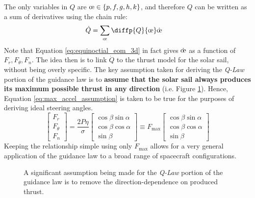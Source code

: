 The only variables in \(Q\) are \(\moe \in \{p, f, g, h, k\}\), and therefore \(Q\) can be written as a sum of derivatives using the chain rule:
\begin{align*}
  \dot{Q} & = \sum_{\moe} \diffp{Q}{{\moe}} \dot{\moe}
\end{align*}
Note that Equation \ref{eq:equinoctial_eom_3d} in fact gives \(\dot{\moe}\) as a function of \(F_r, F_\theta, F_n\). The idea then is to link \(\dot{Q}\) to the thrust model for the solar sail, without being overly specific. The key assumption taken for deriving the \textit{Q-Law} portion of the guidance law is to \textbf{assume that the solar sail always produces its maximum possible thrust in any direction} (i.e. Figure \ref{fig:thrust_curve}). Hence, Equation \ref{eq:max_accel_assumption} is taken to be true for the purposes of deriving ideal steering angles.
\begin{equation}
  \begin{bmatrix}
    F_r      \\
    F_\theta \\
    F_n
  \end{bmatrix} =
  \frac{2P\eta}{\sigma}
  \begin{bmatrix}
    \cos \beta \sin \alpha \\
    \cos \beta \cos \alpha \\
    \sin \beta
  \end{bmatrix}
  \equiv
  F_{\max}
  \begin{bmatrix}
    \cos \beta \sin \alpha \\
    \cos \beta \cos \alpha \\
    \sin \beta
  \end{bmatrix}
  \label{eq:max_accel_assumption}
\end{equation}
Keeping the relationship simple using only \(F_{\max}\) allows for a very general application of the guidance law to a broad range of spacecraft configurations.

\begin{figure}
  \centering
  \caption{A significant assumption being made for the \textit{Q-Law} portion of the guidance law is to remove the direction-dependence on produced thrust.}
  \label{fig:thrust_curve}
\end{figure}

